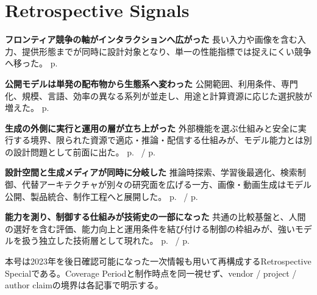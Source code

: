 \section*{Retrospective Signals}
\smallskip
\noindent \textbf{フロンティア競争の軸がインタラクションへ広がった} 長い入力や画像を含む入力、提供形態までが同時に設計対象となり、単一の性能指標では捉えにくい競争へ移った。 \hfill{\footnotesize p.~\pageref{pkg:frontier-interface}}
\par
\smallskip
\noindent \textbf{公開モデルは単発の配布物から生態系へ変わった} 公開範囲、利用条件、専門化、規模、言語、効率の異なる系列が並走し、用途と計算資源に応じた選択肢が増えた。 \hfill{\footnotesize p.~\pageref{pkg:open-weight-ecosystem}}
\par
\smallskip
\noindent \textbf{生成の外側に実行と運用の層が立ち上がった} 外部機能を選ぶ仕組みと安全に実行する境界、限られた資源で適応・推論・配信する仕組みが、モデル能力とは別の設計問題として前面に出た。 \hfill{\footnotesize p.~\pageref{pkg:tool-action-layer} / p.~\pageref{pkg:runtime-adaptation}}
\par
\smallskip
\noindent \textbf{設計空間と生成メディアが同時に分岐した} 推論時探索、学習後最適化、検索制御、代替アーキテクチャが別々の研究面を広げる一方、画像・動画生成はモデル公開、製品統合、制作工程へと展開した。 \hfill{\footnotesize p.~\pageref{pkg:reasoning-retrieval-architecture} / p.~\pageref{pkg:generative-media}}
\par
\smallskip
\noindent \textbf{能力を測り、制御する仕組みが技術史の一部になった} 共通の比較基盤と、人間の選好を含む評価、能力向上と運用条件を結び付ける制御の枠組みが、強いモデルを扱う独立した技術層として現れた。 \hfill{\footnotesize p.~\pageref{pkg:evaluation-control} / p.~\pageref{pkg:annual-synthesis}}
\par
\medskip
\begin{claimboundary}
本号は2023年を後日確認可能になった一次情報も用いて再構成するRetrospective Specialである。Coverage Periodと制作時点を同一視せず、vendor / project / author claimの境界は各記事で明示する。
\end{claimboundary}
\medskip
\tableofcontents
